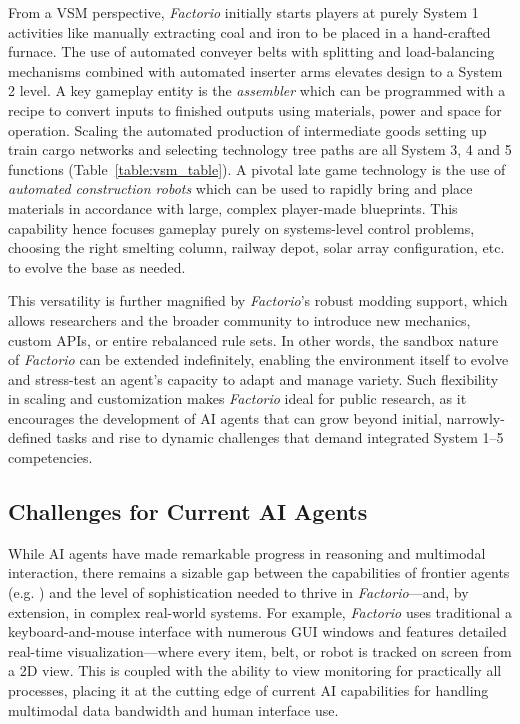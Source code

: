 From a VSM perspective, \textit{Factorio} initially starts players at purely System 1 activities like manually extracting coal and iron to be placed in a hand-crafted furnace. The use of automated conveyer belts with splitting and load-balancing mechanisms combined with automated inserter arms elevates design to a System 2 level. A key gameplay entity is the \textit{assembler} which can be programmed with a recipe to convert inputs to finished outputs using materials, power and space for operation. Scaling the automated production of intermediate goods setting up train cargo networks and selecting technology tree paths are all System 3, 4 and 5 functions (Table~\ref{table:vsm_table}). A pivotal late game technology is the use of \textit{automated construction robots} which can be used to rapidly bring and place materials in accordance with large, complex player-made blueprints. This capability hence focuses gameplay purely on systems-level control problems, choosing the right smelting column, railway depot, solar array configuration, etc. to evolve the base as needed.

This versatility is further magnified by \textit{Factorio}’s robust modding support, which allows researchers and the broader community to introduce new mechanics, custom APIs, or entire rebalanced rule sets. In other words, the sandbox nature of \textit{Factorio} can be extended indefinitely, enabling the environment itself to evolve and stress-test an agent’s capacity to adapt and manage variety. Such flexibility in scaling and customization makes \textit{Factorio} ideal for public research, as it encourages the development of AI agents that can grow beyond initial, narrowly-defined tasks and rise to dynamic challenges that demand integrated System 1–5 competencies.

\subsection{Challenges for Current AI Agents}

While AI agents have made remarkable progress in reasoning and multimodal interaction, there remains a sizable gap between the capabilities of frontier agents (e.g. \cite{deepmind2024mariner, openai2025operator}) and the level of sophistication needed to thrive in \textit{Factorio}—and, by extension, in complex real-world systems. For example, \textit{Factorio} uses traditional a keyboard-and-mouse interface with numerous GUI windows and features detailed real-time visualization—where every item, belt, or robot is tracked on screen from a 2D view. This is coupled with the ability to view monitoring for practically all processes, placing it at the cutting edge of current AI capabilities for handling multimodal data bandwidth and human interface use. 

